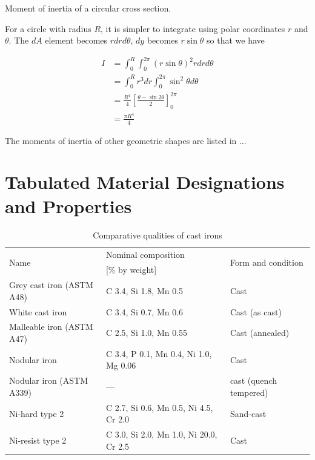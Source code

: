 \documentclass[
10pt,
a4paper,
openany,
svgnames,
]{book}
\begin{document}
\begin{example} Moment of inertia of a circular cross section.

  For a circle with radius $R$, it is simpler to integrate using polar coordinates $r$ and $\theta$. The $dA$ element becomes $rdrd\theta$, $dy$ becomes $r \sin \theta$ so that we have

  \begin{align*}
    I &= \int_0^R \int_0^{2\pi} \left( r \sin \theta \right)^2 r dr d\theta \\
      &= \int_0^R r^3 dr \int_0^{2\pi} \sin^2 \theta d\theta \\
      &= \frac{R^4}{4} \left[ \frac{\theta - \sin 2\theta}{2} \right]_0^{2\pi} \\
      &= \frac{\pi R^4}{4}
  \end{align*}

\end{example}

The moments of inertia of other geometric shapes are listed in ...

\begin{table}
\end{table}

\chapter{Tabulated Material Designations and Properties}

\begin{table}[H]
  \centering
  \begin{tabular}{lll}
    \toprule
    \multirow{2}{2cm}{Name} & Nominal composition & \multirow{2}{3.5cm}{Form and condition} \\
                            & {[}\% by weight{]} & \\
    \midrule
    Grey cast iron (ASTM A48) & C 3.4, Si 1.8, Mn 0.5                  & Cast \\
    White cast iron           & C 3.4, Si 0.7, Mn 0.6                  & Cast (as cast) \\
    Malleable iron (ASTM A47) & C 2.5, Si 1.0, Mn 0.55                 & Cast (annealed) \\
    Nodular iron              & C 3.4, P 0.1, Mn 0.4, Ni 1.0, Mg 0.06  & Cast \\
    Nodular iron (ASTM A339)  & —                                      & cast (quench tempered) \\
    Ni-hard type 2            & C 2.7, Si 0.6, Mn 0.5, Ni 4.5, Cr 2.0  & Sand-cast \\
    Ni-resist type 2          & C 3.0, Si 2.0, Mn 1.0, Ni 20.0, Cr 2.5 & Cast \\
    \bottomrule
  \end{tabular}
  \caption{Comparative qualities of cast irons \cite*{plisga2017standard}}
  \label{tab: cast iron quals}
\end{table}
\end{document}
